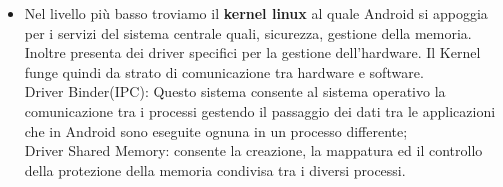 \begin{itemize}
\item Nel livello più basso troviamo il \textbf{kernel linux} al quale Android si appoggia per i servizi del sistema centrale quali, sicurezza, gestione della memoria. Inoltre presenta dei driver specifici per la gestione dell'hardware. Il Kernel funge quindi da strato di comunicazione tra hardware e software.
\\Driver Binder(IPC): Questo sistema consente al sistema operativo la comunicazione tra i processi gestendo il passaggio dei dati tra le applicazioni che in Android sono eseguite ognuna in un processo differente;
\\Driver Shared Memory: consente la creazione, la mappatura ed il controllo della protezione della memoria condivisa tra i diversi processi. 


\end{itemize}
